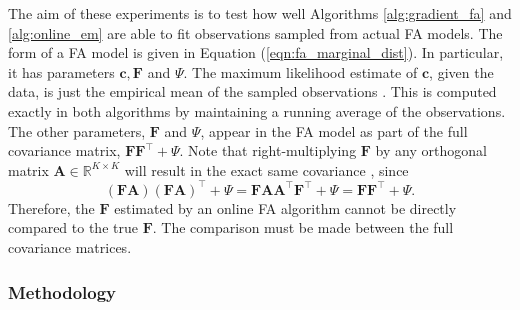 \documentclass[msc,deptreport.inf]{infthesis} %
\newcommand{\matr}[1]{\mathbf{#1}}
\newcommand{\R}{\mathbb R}
\begin{document}
The aim of these experiments is to test how well Algorithms \ref{alg:gradient_fa} and \ref{alg:online_em} are able to fit observations sampled from actual FA models. The form of a FA model is given in Equation (\ref{eqn:fa_marginal_dist}). In particular, it has parameters $\matr{c}, \matr{F}$ and $\Psi$. The maximum likelihood estimate of $\matr{c}$, given the data, is just the empirical mean of the sampled observations \cite{barber2007}. This is computed exactly in both algorithms by maintaining a running average of the observations. The other parameters, $\matr{F}$ and $\Psi$, appear in the FA model as part of the full covariance matrix,  $\matr{F}\matr{F}^\intercal + \Psi$. Note that right-multiplying $\matr{F}$ by any orthogonal matrix $\matr{A} \in \R^{K \times K}$ will result in the exact same covariance \cite{barber2007}, since
\begin{equation}
	(\matr{F} \matr{A}) (\matr{F} \matr{A})^\intercal + \Psi
	= \matr{F} \matr{A} \matr{A}^\intercal \matr{F}^\intercal + \Psi
	= \matr{F} \matr{F}^\intercal + \Psi.
\end{equation}
Therefore, the $\matr{F}$ estimated by an online FA algorithm cannot be directly compared to the true $\matr{F}$. The comparison must be made between the full covariance matrices.  

\subsubsection{Methodology}
\end{document}
